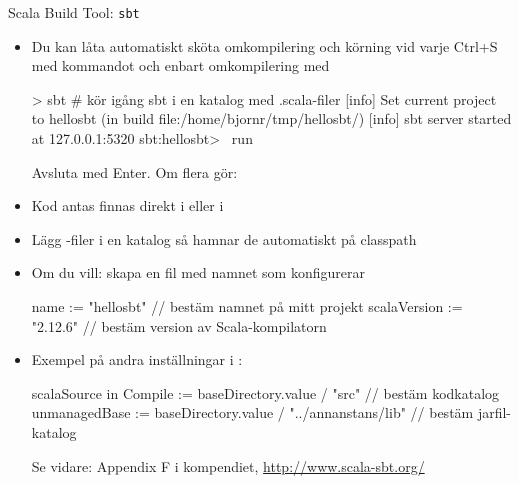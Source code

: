 
\begin{Slide}{Scala Build Tool: \texttt{sbt}}\SlideFontSmall
\begin{itemize}
\item Du kan låta  automatiskt sköta omkompilering och körning vid varje Ctrl+S med kommandot 
och enbart omkompilering med 
\begin{REPL}
> sbt              # kör igång sbt i en katalog med .scala-filer
[info] Set current project to hellosbt (in build file:/home/bjornr/tmp/hellosbt/)
[info] sbt server started at 127.0.0.1:5320
sbt:hellosbt> ~run
\end{REPL}
Avsluta med Enter. Om flera  gör: 
\item Kod antas finnas direkt i  eller i 
\item Lägg -filer i en katalog  så hamnar de automatiskt på classpath
\item Om du vill: skapa en fil med namnet  som konfigurerar 
\begin{Code}
name := "hellosbt"           // bestäm namnet på mitt projekt
scalaVersion := "2.12.6"    // bestäm version av Scala-kompilatorn
\end{Code}
\item Exempel på andra inställningar i :
\begin{CodeSmall}
scalaSource in Compile := baseDirectory.value / "src"      // bestäm kodkatalog
unmanagedBase := baseDirectory.value / "../annanstans/lib" // bestäm jarfil-katalog
\end{CodeSmall}
Se vidare: Appendix F i kompendiet, \url{http://www.scala-sbt.org/}
\end{itemize}
\end{Slide}
